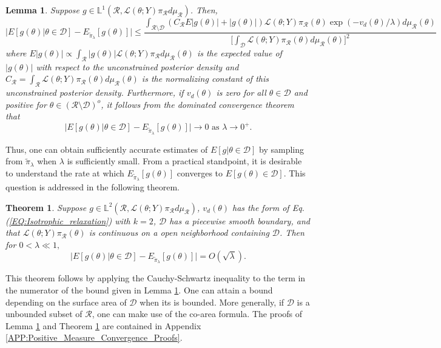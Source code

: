 \documentclass[10pt,fleqn]{article}
\newtheorem{theorem}{Theorem}
\newtheorem{lemma}{Lemma}
\DeclareMathOperator{\1}{\mathbbm{1}}
\begin{document}
{\begin{lemma}
\label{THM:positive_measure_approximation_error}
Suppose $g \in \mathbb{L}^1(\mathcal{R}, \mathcal{L}(\theta;Y)\pi_\mathcal{R}d\mu_\mathcal{R})$.  Then,
$$\bigg|E[g(\theta) |\theta\in\mathcal{D}] - E_{\tilde{\pi}_\lambda}[g(\theta)]   \bigg| \le \frac{\int_{\mathcal{R}\setminus \mathcal{D}} (C_\mathcal{R}E|g(\theta)|+|g(\theta)|) \mathcal{L}(\theta; Y) \pi_\mathcal{R}(\theta)\exp(-v_d(\theta)/\lambda ) d\mu_\mathcal{R}(\theta)}{\big[\int_\mathcal{D} \mathcal{L}(\theta; Y) \pi_\mathcal{R}(\theta)d\mu_\mathcal{R}(\theta)\big]^2 }$$
where $E|g(\theta)| \propto \int_\mathcal{R} |g(\theta)| \mathcal{L}(\theta;Y)\pi_\mathcal{R} d\mu_\mathcal{R}(\theta)$ is the expected value of $|g(\theta)|$ with respect to the unconstrained posterior density and $C_\mathcal{R} = \int_\mathcal{R} \mathcal{L}(\theta;Y)\pi_\mathcal{R}(\theta)d\mu_\mathcal{R}(\theta)$ is the normalizing constant of this unconstrained posterior density. Furthermore, if $v_d(\theta)$ is zero for all $\theta\in\mathcal{D}$ and positive for $\theta\in(\mathcal{R}\setminus\mathcal{D})^o$, it follows from the dominated convergence theorem that $$\bigg|E[g(\theta) |\theta\in\mathcal{D}] - E_{\tilde{\pi}_\lambda}[g(\theta)]   \bigg|\to 0 \text{ as } \lambda \to 0^+.$$
\end{lemma}

Thus, one can obtain sufficiently accurate estimates of $E[g|\theta\in\mathcal{D}]$ by sampling from $\tilde{\pi}_\lambda$ when $\lambda$ is sufficiently small.  From a practical standpoint, it is desirable to understand the rate at which $E_{\tilde{\pi}_\lambda}[g(\theta)] $ converges to $E[g(\theta)\in\mathcal{D}]$. This question is addressed in the following theorem.

\begin{theorem}
\label{THM:Positive_measure_convergence_rate}
Suppose $g \in  \mathbb{L}^2(\mathcal{R}, \mathcal{L}(\theta;Y)\pi_\mathcal{R}d\mu_\mathcal{R})$, $v_d(\theta)$ has the form of Eq. (\ref{EQ:Isotrophic_relaxation}) with $k=2$, $\mathcal{D}$ has a piecewise smooth boundary, and that $\mathcal{L}(\theta;Y)\pi_\mathcal{R}(\theta)$ is continuous on a open neighborhood containing $\mathcal{D}$.  Then for $0<\lambda \ll 1,$
$$ \bigg|E[g(\theta) |\theta\in\mathcal{D}] - E_{\tilde{\pi}_\lambda}[g(\theta)]   \bigg| = O(\sqrt{\lambda}).  $$
\end{theorem}
This theorem follows by applying the Cauchy-Schwartz inequality to the term in the numerator of the bound given in Lemma \ref{THM:positive_measure_approximation_error}.  One can attain a bound depending on the surface area of $\mathcal{D}$ when its is bounded.  More generally, if $\mathcal{D}$ is a unbounded subset of $\mathcal{R}$, one can make use of the co-area formula\cite{federer2014geometric, diaconis2013manifold}. The proofs of Lemma \ref{THM:positive_measure_approximation_error} and Theorem \ref{THM:Positive_measure_convergence_rate} are contained in Appendix \ref{APP:Positive_Measure_Convergence_Proofs}.

}
\end{document}

